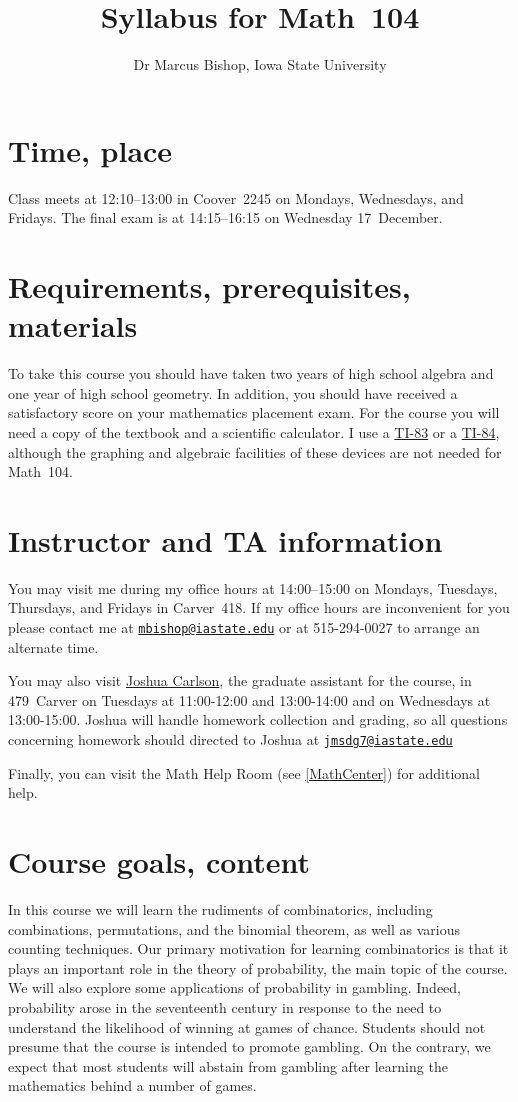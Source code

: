 \documentclass[11pt]{article}
\title{Syllabus for Math~104}
\author{Dr Marcus Bishop, Iowa State University}
\begin{document}
\maketitle

\section{Time, place}\label{Time} Class meets at 12:10--13:00
in Coover~2245 on Mondays, Wednesdays, and Fridays.
The final exam is at 14:15--16:15 on Wednesday 17~December.

\section{Requirements, prerequisites, materials}
To take this course you should have taken two
years of high school algebra and one year of high school geometry.
In addition, you should
have received a satisfactory score on your mathematics placement exam.
For the course you will need a copy of the textbook
and a scientific calculator.
I use a \href{http://en.wikipedia.org/wiki/TI-83}{TI-83} or a
\href{http://en.wikipedia.org/wiki/TI-84}{TI-84}, although
the graphing and algebraic facilities of these devices are
not needed for Math~104.

\section{Instructor and TA information} You may visit me during my office 
hours at 14:00--15:00 on Mondays, Tuesdays, Thursdays, and Fridays
in Carver~418. If my office hours are inconvenient for you
please contact me at 
\href{mailto:mbishop@iastate.edu}{\tt mbishop@iastate.edu} or at 
515-294-0027 to arrange an alternate time.

You may also visit
\href{mailto:jmsdg7@iastate.edu}{Joshua Carlson},
the graduate assistant for the course,
in 479~Carver on Tuesdays at 11:00-12:00 and 13:00-14:00
and on Wednesdays at 13:00-15:00.
Joshua will handle homework collection and grading, so all questions
concerning homework should directed to Joshua at
\href{mailto:jmsdg7@iastate.edu}{\tt jmsdg7@iastate.edu}

Finally, you can visit the Math Help Room (see \autoref{MathCenter})
for additional help.

\section{Course goals, content}
In this course we will learn the rudiments of combinatorics,
including combinations, permutations, and the binomial theorem,
as well as various counting techniques.
Our primary motivation for learning combinatorics is that it
plays an important role in the theory of probability, the main
topic of the course. We will also explore some
applications of probability in gambling. Indeed, probability
arose in the seventeenth century in response to the need
to understand the likelihood of winning at games of chance.
Students should not presume that the course is intended to
promote gambling. On the contrary, we expect that most
students will abstain from gambling after learning the mathematics
behind a number of games.
\end{document}

